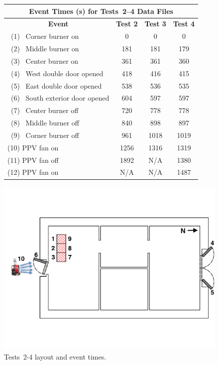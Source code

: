 \documentclass[12pt,oneside]{book}
\begin{document}
\begin{figure}[!ht]
\begin{minipage}[b]{0.8\columnwidth}
	\begin{flushleft}
	\begin{tabular}{lccc}
	\multicolumn{4}{c}{\normalsize Event Times (s) for Tests~2--4 Data Files} \\
	\toprule
	\multicolumn{1}{c}{\textbf{Event}} 	& \textbf{Test 2} & \textbf{Test 3} & \textbf{Test 4} \\
	\midrule
	~(1)~ Corner burner on 				& 	0		  	  &	 	0			&		0		  \\
	~(2)~ Middle burner on 				&   181			  &		181			&		179		  \\
	~(3)~ Center burner on 				&   361			  &	   	361			&	   	360		  \\
	~(4)~ West double door opened 		&   418			  &    	416			&	   	415		  \\
	~(5)~ East double door opened 		&   538			  &    	536			&	   	535		  \\
	~(6)~ South exterior door opened 	&   604			  &    	597			&	   	597		  \\
	~(7)~ Center burner off				&   720			  &    	778			&	   	778		  \\
	~(8)~ Middle burner off				&   840			  &    	898			&	   	897		  \\
	~(9)~ Corner burner off				&   961			  &    	1018		&	   	1019	  \\
	(10) PPV fan on 					& 	1256		  &    	1316		&  	   	1319	  \\
	(11) PPV fan off 					& 	1892 		  & 	N/A 		& 		1380	  \\
	(12) PPV fan on 					& 	N/A 		  & 	N/A 		& 		1487 	  \\
	\bottomrule
	\end{tabular}
	\end{flushleft}
\end{minipage}
\begin{minipage}[b]{0.9\columnwidth}
	\vspace{15pt}
	\centering
	\includegraphics[width=\columnwidth]{../Figures/Floor_Plans/East_Structure_Test_4}
\end{minipage}
\caption{Tests~2-4 layout and event times.}
\label{fig:Tests_2-4_layout}
\end{figure}
\clearpage
\end{document}
